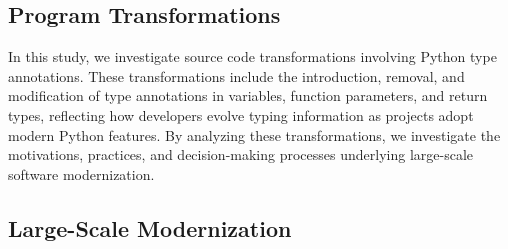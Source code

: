 \subsection{Program Transformations}
\label{subsec:transformations}

In this study, we investigate source code transformations involving Python type annotations. These transformations include the introduction, removal, and modification of type annotations in variables, function parameters, and return types, reflecting how developers evolve typing information as projects adopt modern Python features. By analyzing these transformations, we investigate the motivations, practices, and decision-making processes underlying large-scale software modernization.



\subsection{Large-Scale Modernization}
\label{subsec:large-scale-modernization}



